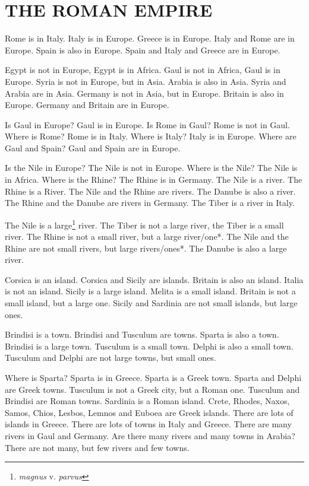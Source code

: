 
\chapter{THE ROMAN EMPIRE}

\linenumbers

Rome is in Italy. Italy is in Europe. Greece is in Europe. Italy and Rome are in Europe. Spain is also in Europe. Spain and Italy and Greece are in Europe.

Egypt is not in Europe, Egypt is in Africa. Gaul is not in Africa, Gaul is in Europe. Syria is not in Europe, but in Asia. Arabia is also in Asia. Syria and Arabia are in Asia. Germany is not in Asia, but in Europe. Britain is also in Europe. Germany and Britain are in Europe.

Is Gaul in Europe? Gaul is in Europe. Is Rome in Gaul? Rome is not in Gaul. Where is Rome? Rome is in Italy. Where is Italy? Italy is in Europe. Where are Gaul and Spain? Gaul and Spain are in Europe.

Is the Nile in Europe? The Nile is not in Europe. Where is the Nile? The Nile is in Africa. Where is the Rhine? The Rhine is in Germany. The Nile is a river. The Rhine is a River. The Nile and the Rhine are rivers. The Danube is also a river. The Rhine and the Danube are rivers in Germany. The Tiber is a river in Italy.

The Nile is a large\footnote{\emph{magnus} v. \emph{parvus}} river. The Tiber is not a large river, the Tiber is a small river. The Rhine is not a small river, but a large river/one*. The Nile and the Rhine are not small rivers, but large rivers/ones*. The Danube is also a large river.

Corsica is an island. Corsica and Sicily are islands. Britain is also an island. Italia is not an island. Sicily is a large island. Melita is a small island. Britain is not a small island, but a large one. Sicily and Sardinia are not small islands, but large ones.

Brindisi is a town. Brindisi and Tusculum are towns. Sparta is also a town. Brindisi is a large town. Tusculum is a small town. Delphi is also a small town. Tusculum and Delphi are not large towns, but small ones.

Where is Sparta? Sparta is in Greece. Sparta is a Greek town. Sparta and Delphi are Greek towns. Tusculum is not a Greek city, but a Roman one. Tusculum and Brindisi are Roman towns. Sardinia is a Roman island. Crete, Rhodes, Naxos, Samos, Chios, Lesbos, Lemnos and Euboea are Greek islands. There are lots of islands in Greece. There are lots of towns in Italy and Greece. There are many rivers in Gaul and Germany. Are there many rivers and many towns in Arabia? There are not many, but few rivers and few towns.

